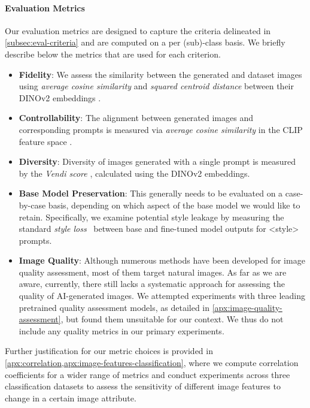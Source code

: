 \paragraph{Evaluation Metrics\afterhead}
Our evaluation metrics are designed to capture the criteria delineated in \cref{subsec:eval-criteria} and are computed on a per (sub)-class basis. We briefly describe below the metrics that are used for each criterion.

\begin{itemize}
\item \textbf{Fidelity}: We assess the similarity between the generated and dataset images using \emph{average cosine similarity} and \emph{squared centroid distance} between their DINOv2 embeddings \citep{oquab2023dinov2}.
\item \textbf{Controllability}: The alignment between generated images and corresponding prompts is measured via \emph{average cosine similarity} in the CLIP feature space \citep{radford2021learning}.
\item \textbf{Diversity}: Diversity of images generated with a single prompt is measured by the \emph{Vendi score} \citep{friedman2023the}, calculated using the DINOv2 embeddings.
\item \textbf{Base Model Preservation}: This generally needs to be evaluated on a case-by-case basis, depending on which aspect of the base model we would like to retain. Specifically, we examine potential style leakage by measuring the standard \emph{style loss}~\citep{johnson2016perceptual} between base and fine-tuned model outputs for <style> prompts.
\item \textbf{Image Quality}: Although numerous methods have been developed for image quality assessment, most of them target natural images.
As far as we are aware, currently, there still lacks a systematic approach for assessing the quality of AI-generated images.
We attempted experiments with three leading pretrained quality assessment models, as detailed in \cref{apx:image-quality-assessment}, but found them unsuitable for our context. 
We thus do not include any quality metrics in our primary experiments.
\end{itemize}

Further justification for our metric choices is provided in \cref{apx:correlation,apx:image-features-classification}, where we compute correlation coefficients for a wider range of metrics and conduct experiments across three classification datasets to assess the sensitivity of different image features to change in a certain image attribute.


